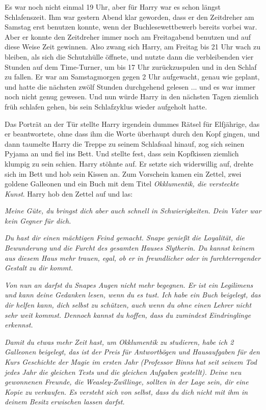 Es war noch nicht einmal 19 Uhr, aber für Harry war es schon längst
Schlafenszeit. Ihm war gestern Abend klar geworden, dass er den Zeitdreher am
Samstag erst benutzen konnte, wenn der Buchlesewettbewerb bereits vorbei war.
Aber er konnte den Zeitdreher immer noch am Freitagabend benutzen und auf diese
Weise Zeit gewinnen. Also zwang sich Harry, am Freitag bis 21 Uhr wach zu
bleiben, als sich die Schutzhülle öffnete, und nutzte dann die verbleibenden
vier Stunden auf dem Time-Turner, um bis 17 Uhr zurückzuspulen und in den Schlaf
zu fallen. Er war am Samstagmorgen gegen 2 Uhr aufgewacht, genau wie geplant,
und hatte die nächsten zwölf Stunden durchgehend gelesen ... und es war immer
noch nicht genug gewesen. Und nun würde Harry in den nächsten Tagen ziemlich
früh schlafen gehen, bis sein Schlafzyklus wieder aufgeholt hatte.

Das Porträt an der Tür stellte Harry irgendein dummes Rätsel für Elfjährige, das
er beantwortete, ohne dass ihm die Worte überhaupt durch den Kopf gingen, und
dann taumelte Harry die Treppe zu seinem Schlafsaal hinauf, zog sich seinen
Pyjama an und fiel ins Bett. Und stellte fest, dass sein Kopfkissen ziemlich
klumpig zu sein schien. Harry stöhnte auf. Er setzte sich widerwillig auf,
drehte sich im Bett und hob sein Kissen an. Zum Vorschein kamen ein Zettel, zwei
goldene Galleonen und ein Buch mit dem Titel \emph{Okklumentik, die versteckte
Kunst}. Harry hob den Zettel auf und las:

\emph{Meine Güte, du bringst dich aber auch schnell in Schwierigkeiten. Dein
Vater war kein Gegner für dich.}

\emph{Du hast dir einen mächtigen Feind gemacht. Snape genießt die Loyalität,
die Bewunderung und die Furcht des gesamten Hauses Slytherin. Du kannst keinem
aus diesem Haus mehr trauen, egal, ob er in freundlicher oder in
furchterregender Gestalt zu dir kommt.}

\emph{Von nun an darfst du Snapes Augen nicht mehr begegnen. Er ist ein
Legilimens und kann deine Gedanken lesen, wenn du es tust. Ich habe ein Buch
beigelegt, das dir helfen kann, dich selbst zu schützen, auch wenn du ohne einen
Lehrer nicht sehr weit kommst. Dennoch kannst du hoffen, dass du zumindest
Eindringlinge erkennst.}

\emph{Damit du etwas mehr Zeit hast, um Okklumentik zu studieren, habe ich 2
Galleonen beigelegt, das ist der Preis für Antwortbögen und Hausaufgaben für den
Kurs Geschichte der Magie im ersten Jahr (Professor Binns hat seit seinem Tod
jedes Jahr die gleichen Tests und die gleichen Aufgaben gestellt). Deine neu
gewonnenen Freunde, die Weasley-Zwillinge, sollten in der Lage sein, dir eine
Kopie zu verkaufen. Es versteht sich von selbst, dass du dich nicht mit ihm in
deinem Besitz erwischen lassen darfst.}

